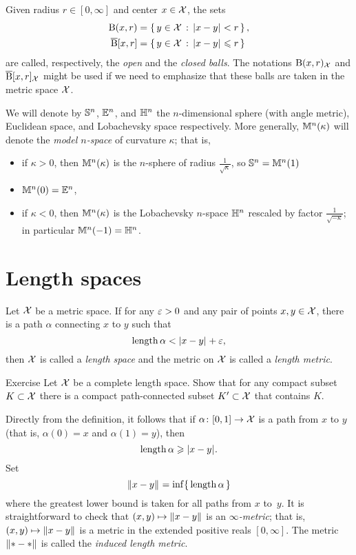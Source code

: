 Given radius $r\in[0,\infty]$ and center $x\in \mathcal{X}$, the sets
\begin{align*}
\mathrm{B}{}(x,r)&=\left\{\,{y\in \mathcal{X}}\,:\,{|{x}-{y}|_{}^{{}}<r}\,\right\},
\\
\overline{\mathrm{B}}{}[x,r]&=\left\{\,{y\in \mathcal{X}}\,:\,{|{x}-{y}|_{}^{{}}\leqslant r}\,\right\}
\end{align*}
are called, respectively, the \emph{open} and  the \emph{closed  balls}.
The notations $\mathrm{B}{}(x,r)_{\mathcal{X}}$ and $\overline{\mathrm{B}}{}[x,r]_{\mathcal{X}}$
might be used if we need to emphasize that these balls are taken in the metric space $\mathcal{X}$.

We will denote by $\mathbb{S}^n$, $\mathbb{E}^n$, and $\mathbb{H}^n$ the $n$-dimensional sphere (with angle metric), 
Euclidean space, and Lobachevsky space respectively.
More generally, $\mathbb{M}^n(\kappa)$ will denote the \emph{model $n$-space} of curvature $\kappa$;
that is,
\begin{itemize}
\item if $\kappa>0$, then $\mathbb{M}^n(\kappa)$ is the $n$-sphere of radius $\tfrac{1}{\sqrt{\kappa}}$, so $\mathbb{S}^n=\mathbb{M}^n(1)$
\item $\mathbb{M}^n(0)=\mathbb{E}^n$,
\item if $\kappa<0$, then $\mathbb{M}^n(\kappa)$ is the Lobachevsky $n$-space $\mathbb{H}^n$ rescaled by factor $\tfrac{1}{\sqrt{-\kappa}}$;
in particular $\mathbb{M}^n(-1)=\mathbb{H}^n$.
\end{itemize}

\section{Length spaces}\label{sec:length}

Let $\mathcal{X}$ be a metric space.
If for any $\varepsilon>0$ and any pair of points $x,y\in\mathcal{X}$, there is a path $\alpha$ connecting $x$ to $y$ such that
\[\mathop{\rm length}\nolimits\alpha< |{x}-{y}|_{}^{{}}+\varepsilon,\]
then $\mathcal{X}$ is called a \emph{length space} and the metric on $\mathcal{X}$ is called a \emph{length metric}.\label{page:length metric}

\begin{thm}{Exercise}\label{ex:compact+connceted}
Let $\mathcal{X}$ be a complete length space.
Show that for any compact subset $K\subset\mathcal{X}$
there is a compact path-connected subset $K'\subset\mathcal{X}$ that contains $K$.  
\end{thm}

Directly from the definition, it follows that if $\alpha\colon[0,1]\to\mathcal{X}$ is a path from $x$ to $y$ 
(that is, $\alpha(0)=x$ and $\alpha(1)=y$), then 
\[\mathop{\rm length}\nolimits\alpha\geqslant |{x}-{y}|_{}^{{}}.\]
Set 
\[\|{x}-{y}\|_{}^{{}}=\inf\{\,\mathop{\rm length}\nolimits\alpha\,\}\]
where the greatest lower bound is taken for all paths from $x$ to~$y$.
It is straightforward to check that $(x,y)\mapsto \|{x}-{y}\|_{}^{{}}$ is an \emph{$\infty$-metric};
that is, $(x,y)\mapsto \|{x}-{y}\|_{}^{{}}$ is a metric in the extended positive reals $[0,\infty]$. 
The metric $\|{*}-{*}\|_{}^{{}}$ is called the \emph{induced length metric}.


